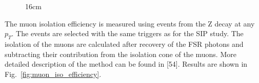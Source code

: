 \begin{figure}[hbtp]{16cm}
	\quad
	\label{fig:muon_sip_efficiency}
\end{figure}

The muon isolation efficiency is measured using events from the Z decay at any $p_{T}$. The events are selected with the same triggers as for the SIP study. The isolation of the muons are calculated after recovery of the FSR photons and subtracting their contribution from the isolation cone of the muons. More detailed description of the method can be found in [54]. Results are shown in Fig.~\ref{fig:muon_iso_efficiency}.

